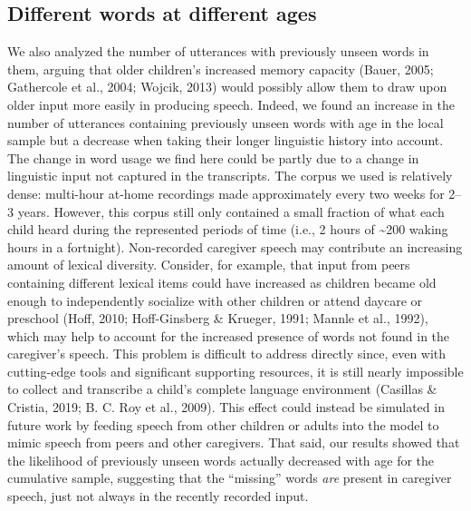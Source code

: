 \documentclass[man,mask,floatsintext]{apa6}
\begin{document}
\subsection{Different words at different
ages}\label{different-words-at-different-ages}

We also analyzed the number of utterances with previously unseen words
in them, arguing that older children's increased memory capacity (Bauer,
2005; Gathercole et al., 2004; Wojcik, 2013) would possibly allow them
to draw upon older input more easily in producing speech. Indeed, we
found an increase in the number of utterances containing previously
unseen words with age in the local sample but a decrease when taking
their longer linguistic history into account. The change in word usage
we find here could be partly due to a change in linguistic input not
captured in the transcripts. The corpus we used is relatively dense:
multi-hour at-home recordings made approximately every two weeks for
2--3 years. However, this corpus still only contained a small fraction
of what each child heard during the represented periods of time (i.e., 2
hours of \textasciitilde{}200 waking hours in a fortnight). Non-recorded
caregiver speech may contribute an increasing amount of lexical
diversity. Consider, for example, that input from peers containing
different lexical items could have increased as children became old
enough to independently socialize with other children or attend daycare
or preschool (Hoff, 2010; Hoff-Ginsberg \& Krueger, 1991; Mannle et al.,
1992), which may help to account for the increased presence of words not
found in the caregiver's speech. This problem is difficult to address
directly since, even with cutting-edge tools and significant supporting
resources, it is still nearly impossible to collect and transcribe a
child's complete language environment (Casillas \& Cristia, 2019; B. C.
Roy et al., 2009). This effect could instead be simulated in future work
by feeding speech from other children or adults into the model to mimic
speech from peers and other caregivers. That said, our results showed
that the likelihood of previously unseen words actually decreased with
age for the cumulative sample, suggesting that the \enquote{missing}
words \emph{are} present in caregiver speech, just not always in the
recently recorded input.
\end{document}

